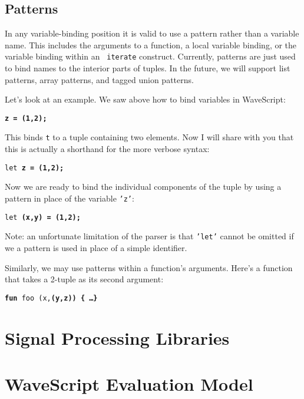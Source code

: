 \section{Patterns}

In any variable-binding position it is valid to use a pattern rather
than a variable name.  This includes the arguments to a function, a
local variable binding, or the variable binding within an {\tt
  iterate} construct.  Currently, patterns are just used to bind names
to the interior parts of tuples.  In the future, we will support list
patterns, array patterns, and tagged union patterns.  

Let's look at an example.
We saw above how to bind variables in WaveScript:
\begin{center}
{\tt \bf{z} = (1,2);}
\end{center}
This binds {\tt t} to a tuple containing two elements.  
Now I will share with you that this is actually a shorthand for the
more verbose syntax:
\begin{center}
{\tt let \bf{z} = (1,2);}
\end{center}
Now we are ready to bind the individual components of the tuple by using
a pattern in place of the variable {\tt 'z'}:
\begin{center}
{\tt let \bf{(x,y)} = (1,2);}
\end{center}
Note: an unfortunate limitation of the parser is that {\tt 'let'} cannot be
omitted if we a pattern is used in place of a simple identifier.

Similarly, we may use patterns within a function's arguments.  Here's
a function that takes a 2-tuple as its second argument:

\begin{center}
{\tt {\bf fun} foo (x,\bf{(y,z)}) \{ \dots \}}
\end{center}


\chapter{Signal Processing Libraries}



\chapter{WaveScript Evaluation Model}





